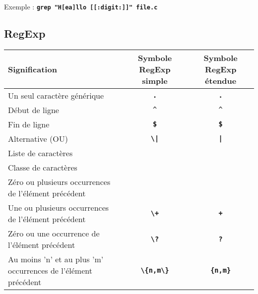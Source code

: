 \documentclass[11pt,a4paper]{article}
\newcommand{\TTBF}[1]{\texttt{\textbf{#1}}}	%
\begin{document}
\bigskip

\noindent Exemple : \TTBF{grep "H[ea]llo [[:digit:]]" file.c}

\newpage

\subsection{RegExp}

\bigskip


\begin{center}
	\begin{tabular}{ M{5cm} | c | c }
	\textbf{Signification} & \textbf{Symbole RegExp simple} & \textbf{Symbole RegExp étendue} \\  \hline
	Un seul caractère générique & \TTBF{\textquotesingle .\textquotesingle} & \TTBF{\textquotesingle .\textquotesingle} \\ \hline
	Début de ligne & \texttt{\textquotesingle \textasciicircum \textquotesingle} & \texttt{\textquotesingle \textasciicircum \textquotesingle} \\ \hline
	Fin de ligne & \TTBF{\textquotesingle \$\textquotesingle} & \TTBF{\textquotesingle \$\textquotesingle} \\ \hline
	Alternative (OU) & \TTBF{\textquotesingle \textbackslash |\textquotesingle} & \TTBF{\textquotesingle |\textquotesingle} \\ \hline
	Liste de caractères & \TTBF{\textquotesingle []\textquotesingle} & \TTBF{\textquotesingle []\textquotesingle} \\ \hline
	Classe de caractères & \TTBF{\textquotesingle [:classe:]\textquotesingle} & \TTBF{\textquotesingle [:classe:]\textquotesingle} \\ \hline
	Zéro ou plusieurs occurrences de l'élément précédent & \TTBF{\textquotesingle *\textquotesingle} & \TTBF{\textquotesingle *\textquotesingle} \\ \hline
	Une ou plusieurs occurrences de l'élément précédent & \TTBF{\textquotesingle \textbackslash +\textquotesingle} & \TTBF{\textquotesingle +\textquotesingle} \\ \hline
	Zéro ou une occurrence de l'élément précédent & \TTBF{\textquotesingle \textbackslash ?\textquotesingle} & \TTBF{\textquotesingle ?\textquotesingle} \\ \hline
	Au moins 'n' et au plus 'm' occurrences de l'élément précédent & \TTBF{\textquotesingle \textbackslash \{n,m\textbackslash \}\textquotesingle} & \TTBF{\textquotesingle \{n,m\}\textquotesingle} \\ \hline

\end{tabular}
\end{center}
\end{document}
